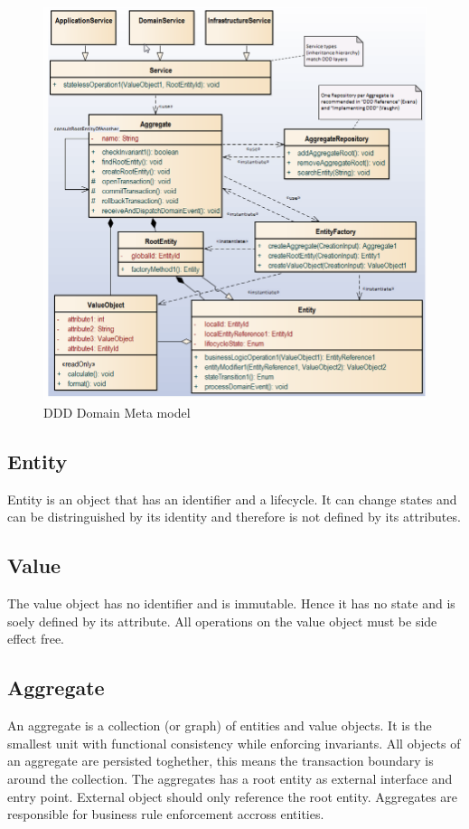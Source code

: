 \documentclass[../Main.tex]{subfiles}
\begin{document}
\begin{figure}[H]
    \centering
    \includegraphics[width=1\linewidth]{Images/ddd-meta-model.png}
    \caption{DDD Domain Meta model}
\end{figure}

\subsection{Entity}
Entity is an object that has an identifier and a lifecycle.
It can change states and can be distringuished by its identity
and therefore is not defined by its attributes.

\subsection{Value}
The value object has no identifier and is immutable.
Hence it has no state and is soely defined by its attribute.
All operations on the value object must be side effect free.

\subsection{Aggregate}
An aggregate is a collection (or graph) of entities and value objects.
It is the smallest unit with functional consistency while enforcing invariants.
All objects of an aggregate are persisted toghether, this means
the transaction boundary is around the collection.
The aggregates has a root entity as external interface and entry point.
External object should only reference the root entity.
Aggregates are responsible for business rule enforcement accross entities.
\end{document}
